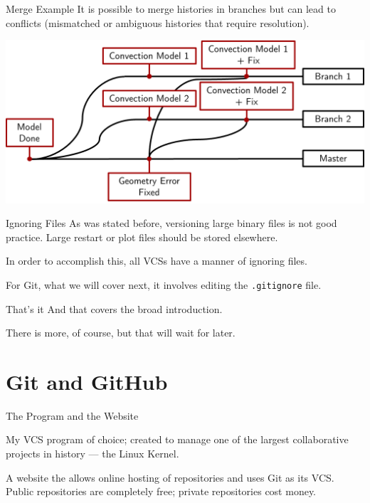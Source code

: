 \documentclass[10pt,t,xcolor=table]{UWMadBeamer}
\begin{document}
    \begin{frame}[c]{Merge Example}
        It is possible to {merge} histories in branches but can lead to { conflicts} (mismatched or ambiguous histories that require resolution).
        
        {
            \centering
            \includegraphics[scale=0.50]{MergeExample}
        }
    \end{frame}

    \begin{frame}[c]{Ignoring Files}
        As was stated before, versioning large binary files is not good practice.
        Large restart or plot files should be stored elsewhere.

        In order to accomplish this, all VCSs have a manner of ignoring files.

        For Git, what we will cover next, it involves editing the \texttt{.gitignore} file.
    \end{frame}

    \begin{frame}{That's it}
        And that covers the broad introduction.
        
        There is more, of course, but that will wait for later.
    \end{frame}



\section{Git and GitHub}
    \begin{frame}{The Program and the Website}
        \begin{description}
            \setlength{\itemsep}{0.65em}
            \item[{\usebeamercolor[fg]{frametitle} Git}]
                {My VCS program of choice; created to manage one of the largest collaborative projects in history --- the Linux Kernel.}
            \item[{\usebeamercolor[fg]{frametitle} GitHub}]
                {A website the allows online hosting of repositories and uses Git as its VCS.  Public repositories are completely free; private repositories cost money.}
        \end{description}
    \end{frame}
\end{document}
